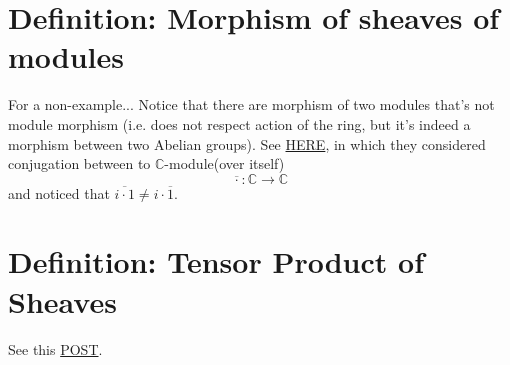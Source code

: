 \section{Definition: Morphism of sheaves of modules}

For a non-example... Notice that there are morphism of two modules that's not module morphism (i.e. does not respect action of the ring, but it's indeed a morphism between two Abelian groups). See \href{https://math.stackexchange.com/questions/1856824/is-a-group-homomorphism-a-module-homomorphism}{HERE}, in which they considered conjugation between to $\mathbb C$-module(over itself)
\[\overline{\cdot}:\mathbb C\to\mathbb C\]
and noticed that $\overline{i\cdot 1}\neq i\cdot \overline{1}$.

\section{Definition: Tensor Product of Sheaves}

See this \href{https://math.stackexchange.com/questions/1488296/tensor-product-of-sheaves-is-not-a-sheaf}{POST}.

\begin{comment}
\subsection{A Counterexample by ChatGPT}

Let \( X = \mathbb{R} \) be the real line, and consider the following covering:
\[ U_1 = (-\infty, 1) \quad \text{and} \quad U_2 = (-1, \infty) \]

We define two sheaves:
\begin{itemize}
    \item $\mathcal{F}$ is the sheaf of continuous real-valued functions on $X$.
    \item $\mathcal{G}$ is the sheaf of bounded real-valued functions on $X$.
\end{itemize}
Now, let's define the presheaf $\mathcal{H}$ on $X$ as the tensor product presheaf $\mathcal{F} \otimes \mathcal{G}$, where:


Consider the continuous, bounded functions \( f_1(x) = e^x \) defined on \( U_1 \) and \( f_2(x) = e^{-x} \) defined on \( U_2 \). These functions agree on the intersection \( U_1 \cap U_2 = \emptyset \).

However, if we attempt to glue these functions together to form a candidate section \( s \) over \( X \), we encounter a problem. Since \( f_1(x) \) and \( f_2(x) \) have different behaviors on the intervals \( U_1 \) and \( U_2 \), respectively, there is no continuous, bounded function that can extend both \( f_1(x) \) and \( f_2(x) \) over the entire real line \( X \).
\end{comment}


